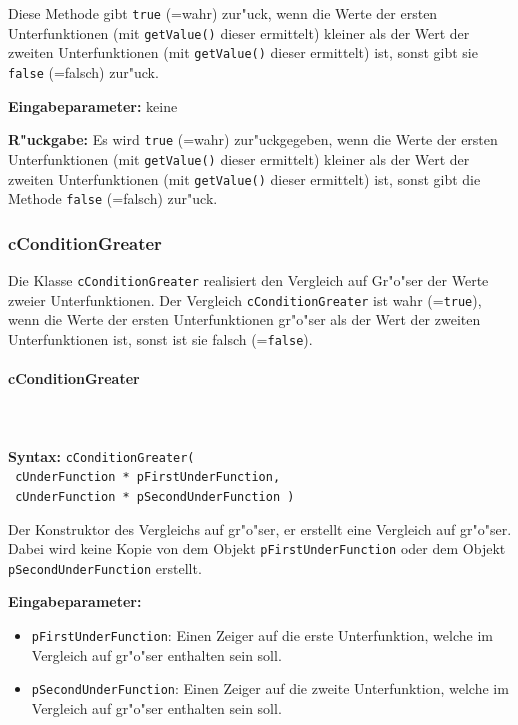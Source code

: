 \bigskip\noindent
Diese Methode gibt \verb|true| (=wahr) zur"uck, wenn die Werte der ersten Unterfunktionen (mit \verb|getValue()| dieser ermittelt) kleiner als der Wert der zweiten Unterfunktionen (mit \verb|getValue()| dieser ermittelt) ist, sonst gibt sie \verb|false| (=falsch) zur"uck.

\bigskip\noindent
\textbf{Eingabeparameter:} keine

\bigskip\noindent
\textbf{R"uckgabe:} Es wird \verb|true| (=wahr) zur"uckgegeben, wenn die Werte der ersten Unterfunktionen (mit \verb|getValue()| dieser ermittelt) kleiner als der Wert der zweiten Unterfunktionen (mit \verb|getValue()| dieser ermittelt) ist, sonst gibt die Methode \verb|false| (=falsch) zur"uck.


\subsubsection{cConditionGreater}

Die Klasse \verb|cConditionGreater| realisiert den Vergleich auf Gr"o"ser der Werte zweier Unterfunktionen. Der Vergleich \verb|cConditionGreater| ist wahr (=\verb|true|), wenn die Werte der ersten Unterfunktionen gr"o"ser als der Wert der zweiten Unterfunktionen ist, sonst ist sie falsch  (=\verb|false|).


\paragraph{cConditionGreater}

\ \\\\\noindent
\textbf{Syntax:} \verb|cConditionGreater(| \\\verb| cUnderFunction * pFirstUnderFunction,| \\\verb| cUnderFunction * pSecondUnderFunction )|

\bigskip\noindent
Der Konstruktor des Vergleichs auf gr"o"ser, er erstellt eine Vergleich auf gr"o"ser. Dabei wird keine Kopie von dem Objekt \verb|pFirstUnderFunction| oder dem Objekt \verb|pSecondUnderFunction| erstellt.

\bigskip\noindent
\textbf{Eingabeparameter:}
\begin{itemize}
 \item \verb|pFirstUnderFunction|: Einen Zeiger auf die erste Unterfunktion, welche im Vergleich auf gr"o"ser enthalten sein soll.
 \item \verb|pSecondUnderFunction|: Einen Zeiger auf die zweite Unterfunktion, welche im Vergleich auf gr"o"ser enthalten sein soll.
\end{itemize}

